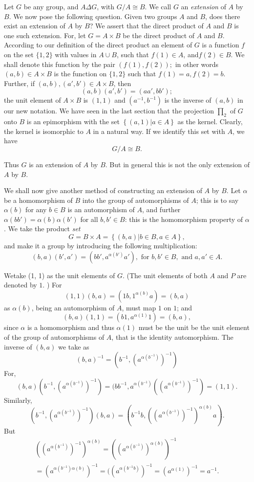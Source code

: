 Let $G$ be any group, and $A \Delta G$, with $G/A \cong B$. We call
$G$ an \textit{extension} of $A$ by $B$. We now pose the following
question. Given two groups $A$ and $B$, does there exist an extension
of $A$ by $B$?  We assert that the direct product of $A$ and $B$ is
one such extension. For, let $G= A \times B$ be the direct product of
$A$ and $B$. According  to our definition of the direct product an
element of $G$ is a function $f$ on the set  $\{ 1,2\}$ with values in
$A \cup B$, such that $f(1) \in  A$, and\pageoriginale $f(2)\in 
B$. We shall denote this function by the pair $(f(1), f(2));$ in other
words $(a, b) \in  A \times B$ is the function on $\{ 1, 2 \}$
such that $f(1) = a, f(2) =b$. Further, if $(a, b), (a', b')
\in  A \times B$, then  
$$
(a, b)(a', b') = (aa', bb') ;
$$ 
the unit element of $A \times B$ is $(1, 1)$ and $(a^{-1}, b^{-1})$ is the
inverse of $(a, b)$ in our new notation. We have seen in the last
section that the projection $\prod_2$ of $G$ onto $B$ is an
epimorphism with the set $\left\{ (a,1) \bigg| a \in  A
\right\}$ as the kernel. Clearly, the kernel is isomorphic to $A$
in a natural way. If we identify this set with $A$, we have  
$$
G/A \cong B.
$$

Thus $G$ is an extension of $A$ by $B$. But in general this is not the
only extension of $A$ by $B$.

We shall now give another method of constructing an extension of $A$
by $B$. Let $\alpha$ be a homomorphism of $B$ into the group of
automorphisms of $A$; this is to say $\alpha (b)$ for any $b
\in  B$ is an automorphism of $A$, and further $\alpha(bb') =
\alpha (b) \alpha(b')$ for all $ b, b' \in  B$: this is the
homomorphism property of $\alpha$. We take the product \textit{set}  
$$
G=B \times A= \left\{ (b,a) \bigg| b \in  B, a \in  A \right\},
$$
and make it a group by introducing the following multiplication: 
$$
(b, a)(b', a')= (bb', a^{\alpha(b')}a'), \text{ for } b, b'
\in  B, \text{ and } a, a' \in  A. 
$$

We\pageoriginale take (1, 1) as the unit elements of $G$. (The unit elements of
both $A$ and $P$ are denoted by $1$. ) For 
$$
(1, 1)(b, a) = (1b,1^{\alpha(b)}a) = (b,a)
$$
as $\alpha (b)$, being an automorphism of $A$, must map $1$ on $1$; and 
$$
(b, a)(1,1) =(b1, a^{\alpha (1)}1) = (b, a), 
$$ 
since $\alpha$ is a homomorphism and thus $\alpha (1)$ must be the
unit be the unit element of the group of automorphisms of $A$, that is
the identity automorphism. The inverse of $(b, a)$ we take as  
$$
(b, a)^{-1}= (b^{-1},(a^{\alpha(b^{-1})})^{-1})
$$
For,  
$$
(b,a)(b^{-1},(a^{\alpha(b^{-1})})^{-1}) = (bb^{-1},
a^{\alpha(b^{-1})}((a^{\alpha(b^{-1})})^{-1}) =(1,1).
$$ 
Similarly,  
$$
(b^{-1},(a^{\alpha(b^{-1})})^{-1})(b,a)
=(b^{-1}b,((a^{\alpha(b^{-1})})^{-1})^{\alpha (b)}a).
$$ 
But 
\begin{multline*}
  ((a^{\alpha(b^{-1})})^{-1})^{\alpha (b)} =
  ((a^{\alpha(b^{-1})})^{\alpha (b)})^{-1}\\ 
  =(a^{\alpha(b^{-1}) \alpha
    (b)})^{-1}= ((a^{\alpha(b^{-1}b)})^{-1} = (a^{\alpha (1)})^{-1}=
  a^{-1}.
\end{multline*}

